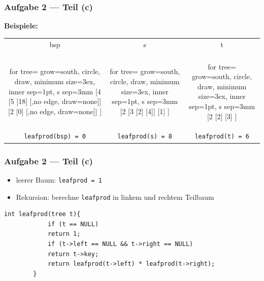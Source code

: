 \documentclass{beamer}
\begin{document}
\begin{frame}[fragile] \frametitle{Aufgabe 2 --- Teil (c)}
	\textbf{Beispiele:}
	
	\begin{center}
		\begin{tabular}{ccc}
			bsp & s & t \\ \\
			\begin{forest}
				for tree={ grow=south, circle, draw, minimum size=3ex, inner sep=1pt, s sep=3mm }
				[4 	[5 [18] [,no edge, draw=none]] [2 [0] [,no edge, draw=none]] ]
			\end{forest}
			&
			\begin{forest}
				for tree={ grow=south, circle, draw, minimum size=3ex, inner sep=1pt, s sep=3mm }
				[2 	[3 [2] [4]] [1] ]
			\end{forest}
			&
			\begin{forest}
				for tree={ grow=south, circle, draw, minimum size=3ex, inner sep=1pt, s sep=3mm }
				[2 	[2] [3] ]
			\end{forest} \\ \pause
			\footnotesize \texttt{leafprod(bsp) = 0} &
			\footnotesize \texttt{leafprod(s) = 8} &
			\footnotesize \texttt{leafprod(t) = 6}
		\end{tabular}
	\end{center}
\end{frame}
\begin{frame}[fragile] \frametitle{Aufgabe 2 --- Teil (c)}
	\begin{itemize}
		\item leerer Baum: \texttt{leafprod = 1}
		\item Rekursion: berechne \texttt{leafprod} in linkem und rechtem Teilbaum
	\end{itemize}
	\pause
	\begin{lstlisting}[style=notebook]
		int leafprod(tree t){
			if (t == NULL)
			return 1;
			if (t->left == NULL && t->right == NULL)
			return t->key;
			return leafprod(t->left) * leafprod(t->right);
		}
	\end{lstlisting}
\end{frame}
\end{document}
